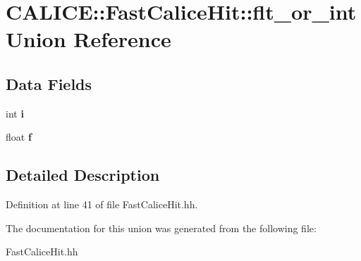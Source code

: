 \section{C\-A\-L\-I\-C\-E\-:\-:Fast\-Calice\-Hit\-:\-:flt\-\_\-or\-\_\-int Union Reference}
\label{unionCALICE_1_1FastCaliceHit_1_1flt__or__int}
\subsection*{Data Fields}
\begin{DoxyCompactItemize}
\item 
int {\bfseries i}\label{unionCALICE_1_1FastCaliceHit_1_1flt__or__int_ab600d412d91497cfd4279e1133cd5045}

\item 
float {\bfseries f}\label{unionCALICE_1_1FastCaliceHit_1_1flt__or__int_adf2a843f43384add37cef4f180b7735a}

\end{DoxyCompactItemize}


\subsection{Detailed Description}


Definition at line 41 of file Fast\-Calice\-Hit.\-hh.



The documentation for this union was generated from the following file\-:\begin{DoxyCompactItemize}
\item 
Fast\-Calice\-Hit.\-hh\end{DoxyCompactItemize}
